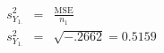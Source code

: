 

\[
\begin{array}{lcl} s_{Y_{1.}}^{2} & = & \frac{\mbox{MSE}}{n_1} \\ s_{Y_{1.}}^{2} & = & \sqrt{-.2662} = 0.5159 \end{array}
\]


